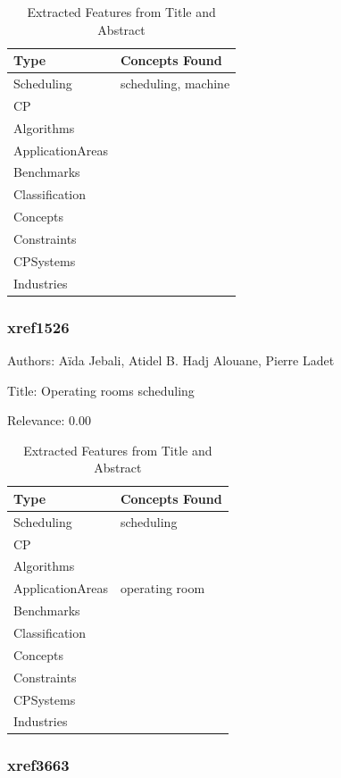 {\scriptsize
\begin{longtable}{p{2cm}p{20cm}}
\caption{Extracted Features from Title and Abstract}\\ \toprule
Type & Concepts Found\\ \midrule
\endhead
\bottomrule
\endfoot
Scheduling & scheduling, machine\\ 
CP & \\ 
Algorithms & \\ 
ApplicationAreas & \\ 
Benchmarks & \\ 
Classification & \\ 
Concepts & \\ 
Constraints & \\ 
CPSystems & \\ 
Industries & \\ 
\end{longtable}
}



\subsubsection{xref1526}
\label{mw:xref1526}

Authors: Aïda Jebali, Atidel B. Hadj Alouane, Pierre Ladet

Title: Operating rooms scheduling

Relevance:  0.00

{\scriptsize
\begin{longtable}{p{2cm}p{20cm}}
\caption{Extracted Features from Title and Abstract}\\ \toprule
Type & Concepts Found\\ \midrule
\endhead
\bottomrule
\endfoot
Scheduling & scheduling\\ 
CP & \\ 
Algorithms & \\ 
ApplicationAreas & operating room\\ 
Benchmarks & \\ 
Classification & \\ 
Concepts & \\ 
Constraints & \\ 
CPSystems & \\ 
Industries & \\ 
\end{longtable}
}



\subsubsection{xref3663}
\label{mw:xref3663}

